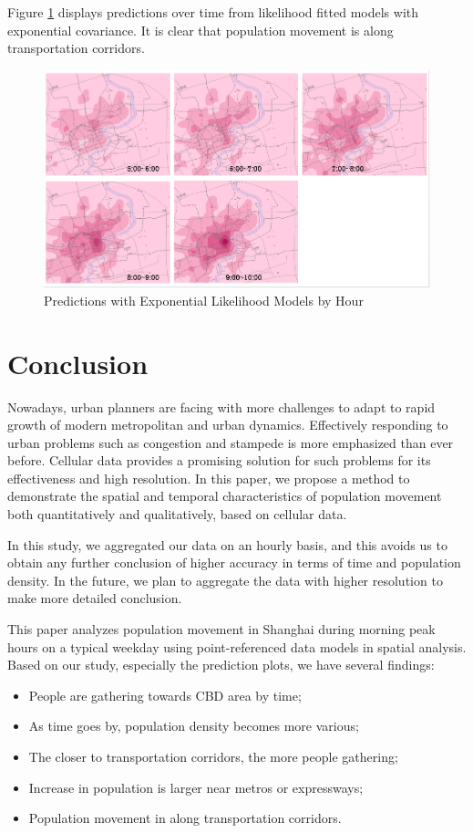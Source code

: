 \documentclass[hidelinks,12pt]{article}
\begin{document}
	 Figure \ref{fig:predexp} displays predictions over time from likelihood fitted models with exponential covariance. It is clear that population movement is along transportation corridors.
	 \begin{figure}[!ht]
	 	\includegraphics[width=\textwidth]{pred_exp.png}
	 	\caption{Predictions with Exponential Likelihood Models by Hour \label{fig:predexp}}
	 \end{figure}
 \FloatBarrier
 
	 

	\section{Conclusion}\label{sec:con}
	Nowadays, urban planners are facing with more challenges to adapt to rapid growth of modern metropolitan and urban dynamics. Effectively responding to urban problems such as congestion and stampede is more emphasized than ever before. Cellular data provides a promising solution for such problems for its effectiveness and high resolution. In this paper, we propose a method to demonstrate the spatial and temporal characteristics of population movement both quantitatively and qualitatively, based on cellular data.
	
	In this study, we aggregated our data on an hourly basis, and this avoids us to obtain any further conclusion of higher accuracy in terms of time and population density. In the future, we plan to aggregate the data with higher resolution to make more detailed conclusion.
	
	This paper analyzes population movement in Shanghai during morning peak hours on a typical weekday using point-referenced data models in spatial analysis. Based on our study, especially the prediction plots, we have several findings:
	\begin{itemize}
		\item People are gathering towards CBD area by time;
		\item As time goes by, population density becomes more various;
		\item The closer to transportation corridors, the more people gathering;
		\item Increase in population is larger near metros or expressways;
		\item Population movement in along transportation corridors.
	\end{itemize}
\end{document}
